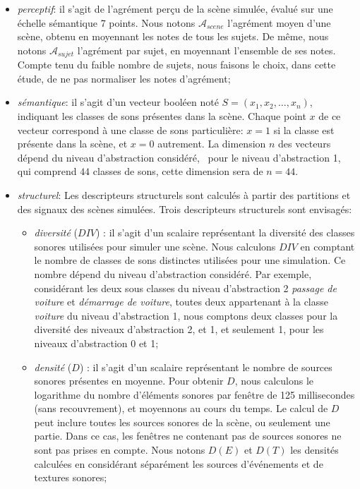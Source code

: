 \begin{itemize}
\item \emph{perceptif}: il s'agit de l'agrément perçu de la scène simulée, évalué sur une échelle sémantique 7 points. Nous notons $\mathcal{A}_{scene}$ l'agrément moyen d'une scène, obtenu en moyennant les notes de tous les sujets. De même, nous notons  $\mathcal{A}_{sujet}$ l'agrément par sujet, en moyennant l'ensemble de ses notes. Compte tenu du faible nombre de sujets, nous faisons le choix, dans cette étude, de ne pas normaliser les notes d'agrément;
\item \emph{sémantique}: il s'agit d'un vecteur booléen noté $S=(x_1,x_2,\ldots,x_n)$, indiquant les classes de sons présentes dans la scène. Chaque point $x$ de ce vecteur correspond à une classe de sons particulière: $x=1$ si la classe est présente dans la scène, et $x=0$ autrement. La dimension $n$ des vecteurs dépend du niveau d'abstraction considéré, \eg~pour le niveau d'abstraction 1, qui comprend $44$ classes de sons, cette dimension sera de $n=44$.
\item \emph{structurel}: Les descripteurs structurels sont calculés à partir des partitions et des signaux des scènes simulées. Trois descripteurs structurels sont envisagés:
\begin{itemize}
\item \emph{diversité} ($DIV$) : il s'agit d'un scalaire représentant la diversité des classes sonores utilisées pour simuler une scène. Nous calculons $DIV$ en comptant le nombre de classes de sons distinctes utilisées pour une simulation. Ce nombre dépend du niveau d'abstraction considéré. Par exemple, considérant les deux sous classes du niveau d'abstraction 2 \emph{passage de voiture} et \emph{démarrage de voiture}, toutes deux appartenant à la classe \emph{voiture} du niveau d'abstraction 1, nous comptons deux classes pour la diversité des niveaux d'abstraction 2, et 1, et seulement 1, pour les niveaux d'abstraction 0 et 1;
\item \emph{densité} ($D$) : il s'agit d'un scalaire représentant le nombre de sources sonores présentes en moyenne. Pour obtenir $D$, nous calculons le logarithme du nombre d'éléments sonores par fenêtre de 125 millisecondes (sans recouvrement), et moyennons au cours du temps. Le calcul de $D$ peut inclure toutes les sources sonores de la scène, ou seulement une partie. Dans ce cas, les fenêtres ne contenant pas de sources sonores ne sont pas prises en compte. Nous notons $D(E)$ et $D(T)$ les densités calculées en considérant séparément les sources d'événements et de textures sonores;

\end{itemize}
\end{itemize}
